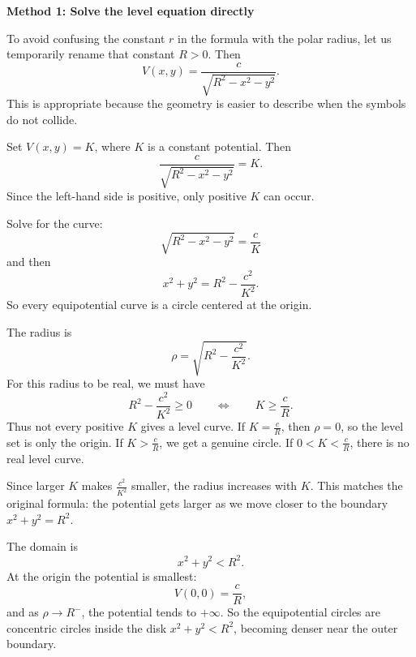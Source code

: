 \documentclass[a4paper,12pt,twocolumn]{article}
\newenvironment{solutionbox}{\begin{framed}}{\end{framed}}
\begin{document}
\begin{solutionbox}
\textbf{Method 1: Solve the level equation directly}

\begin{steps}
\item To avoid confusing the constant \(r\) in the formula with the polar radius, let us temporarily rename that constant \(R>0\). Then
\[
V(x,y)=\frac{c}{\sqrt{R^2-x^2-y^2}}.
\]
This is appropriate because the geometry is easier to describe when the symbols do not collide.

\item Set \(V(x,y)=K\), where \(K\) is a constant potential. Then
\[
\frac{c}{\sqrt{R^2-x^2-y^2}}=K.
\]
Since the left-hand side is positive, only positive \(K\) can occur.

\item Solve for the curve:
\[
\sqrt{R^2-x^2-y^2}=\frac{c}{K}
\]
and then
\[
x^2+y^2=R^2-\frac{c^2}{K^2}.
\]
So every equipotential curve is a circle centered at the origin.

\item The radius is
\[
\rho=\sqrt{R^2-\frac{c^2}{K^2}}.
\]
For this radius to be real, we must have
\[
R^2-\frac{c^2}{K^2}\ge 0
\qquad\Longleftrightarrow\qquad
K\ge \frac{c}{R}.
\]
Thus not every positive \(K\) gives a level curve. If \(K=\frac{c}{R}\), then \(\rho=0\), so the level set is only the origin. If \(K>\frac{c}{R}\), we get a genuine circle. If \(0<K<\frac{c}{R}\), there is no real level curve.

\item Since larger \(K\) makes \(\frac{c^2}{K^2}\) smaller, the radius increases with \(K\). This matches the original formula: the potential gets larger as we move closer to the boundary \(x^2+y^2=R^2\).

\item The domain is
\[
x^2+y^2<R^2.
\]
At the origin the potential is smallest:
\[
V(0,0)=\frac{c}{R},
\]
and as \(\rho\to R^{-}\), the potential tends to \(+\infty\). So the equipotential circles are concentric circles inside the disk \(x^2+y^2<R^2\), becoming denser near the outer boundary.
\end{steps}
\end{solutionbox}
\end{document}
